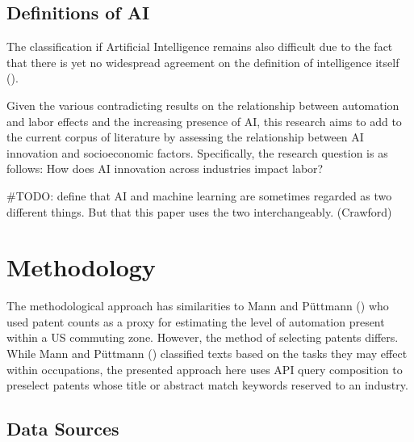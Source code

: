 \documentclass[
  11,
  a4paperpaper,
]{article}
\let\oldsection\section
\renewcommand\section{\clearpage\oldsection}
\begin{document}
\subsection{Definitions of AI}\label{definitions-of-ai}

The classification if Artificial Intelligence remains also difficult due
to the fact that there is yet no widespread agreement on the definition
of intelligence itself ().

Given the various contradicting results on the relationship between
automation and labor effects and the increasing presence of AI, this
research aims to add to the current corpus of literature by assessing
the relationship between AI innovation and socioeconomic factors.
Specifically, the research question is as follows: How does AI
innovation across industries impact labor?

\#TODO: define that AI and machine learning are sometimes regarded as
two different things. But that this paper uses the two interchangeably.
(Crawford)

\section{Methodology}\label{methodology}

The methodological approach has similarities to Mann and Püttmann
() who used patent counts as
a proxy for estimating the level of automation present within a US
commuting zone. However, the method of selecting patents differs. While
Mann and Püttmann () classified
texts based on the tasks they may effect within occupations, the
presented approach here uses API query composition to preselect patents
whose title or abstract match keywords reserved to an industry.

\subsection{Data Sources}\label{sec-data-sources}
\end{document}
